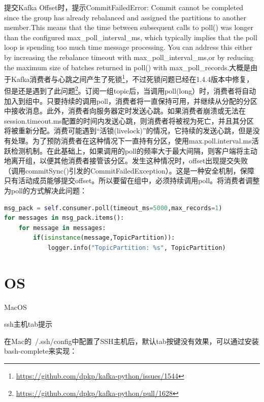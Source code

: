 \documentclass[8pt]{book}
\makeatletter
\numberwithin{dummy}{section}
\theoremstyle{ocrenumbox}
\theoremstyle{blacknumex}
\theoremstyle{blacknumbox}
\theoremstyle{ocrenum}
\renewcommand{\section}{\@startsection{section}{1}{\z@}
	{-4ex \@plus -1ex \@minus -.4ex}
	{1ex \@plus.2ex }
	{\normalfont\large\sffamily\bfseries}}
\renewcommand{\subsection}{\@startsection {subsection}{2}{\z@}
	{-3ex \@plus -0.1ex \@minus -.4ex}
	{0.5ex \@plus.2ex }
	{\normalfont\sffamily\bfseries}}
\makeatother
\begin{document}
提交Kafka Offset时，提示CommitFailedError: Commit cannot be completed since the group has already rebalanced and assigned the partitions to another member.This means that the time between subsequent calls to poll() was longer than the configured max\_poll\_interval\_ms, which typically implies that the poll loop is spending too much time message processing. You can address this either by increasing the rebalance timeout with max\_poll\_interval\_ms,or by reducing the maximum size of batches returned in poll() with max\_poll\_records.大概是由于Kafka消费者与心跳之间产生了死锁\footnote{\url{https://github.com/dpkp/kafka-python/issues/1544}}，不过死锁问题已经在1.4.4版本中修复，但是还是遇到了此问题\footnote{\url{https://github.com/dpkp/kafka-python/pull/1628}}。订阅一组topic后，当调用poll(long）时，消费者将自动加入到组中。只要持续的调用poll，消费者将一直保持可用，并继续从分配的分区中接收消息。此外，消费者向服务器定时发送心跳。如果消费者崩溃或无法在session.timeout.ms配置的时间内发送心跳，则消费者将被视为死亡，并且其分区将被重新分配。消费可能遇到“活锁(livelock)”的情况，它持续的发送心跳，但是没有处理。为了预防消费者在这种情况下一直持有分区，使用max.poll.interval.ms活跃检测机制。在此基础上，如果调用的poll的频率大于最大间隔，则客户端将主动地离开组，以便其他消费者接管该分区。发生这种情况时，offset出现提交失败（调用commitSync()引发的CommitFailedException）。这是一种安全机制，保障只有活动成员能够提交offset。所以要留在组中，必须持续调用poll。将消费者调整为poll的方式解决此问题：

\begin{lstlisting}[language=Python]
msg_pack = self.consumer.poll(timeout_ms=5000,max_records=1)
for messages in msg_pack.items():
    for message in messages:
        if(isinstance(message,TopicPartition)):
            logger.info("TopicPartition: %s", TopicPartition)
\end{lstlisting}

\chapter{OS}

\section{MacOS}

\subsection{ssh主机tab提示}

在Mac的~/.ssh/config中配置了SSH主机后，默认tab按键没有效果，可以通过安装bash-complete来实现：
\end{document}
